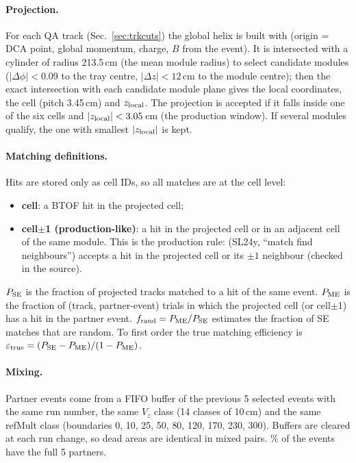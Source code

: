 
\paragraph{Projection.} For each QA track (Sec.~\ref{sec:trkcuts}) the global helix is built with
 (origin = DCA point, global momentum, charge, $B$ from the event).
It is intersected with a cylinder of radius 213.5\,cm (the mean module radius) to select candidate
modules ($|\Delta\phi|<0.09$ to the tray centre, $|\Delta z|<12$\,cm to the module centre); then the exact
intersection with each candidate module plane gives the local coordinates, the cell (pitch 3.45\,cm) and
$z_{\rm local}$. The projection is accepted if it falls inside one of the six cells and $|z_{\rm local}|<3.05$\,cm
(the production window). If several modules qualify, the one with smallest $|z_{\rm local}|$ is kept.

\paragraph{Matching definitions.} Hits are stored only as cell IDs, so all matches are at the cell level:
\begin{itemize}
\item \textbf{cell}: a BTOF hit in the projected cell;
\item \textbf{cell$\pm$1 (production-like)}: a hit in the projected cell or in an adjacent cell of the same module.
  This is the production rule:  (SL24y, ``match find neighbours'') accepts a hit in the
  projected cell or its $\pm1$ neighbour (checked in the source).
\end{itemize}
$P_{\rm SE}$ is the fraction of projected tracks matched to a hit of the same event.
$P_{\rm ME}$ is the fraction of (track, partner-event) trials in which the projected cell (or cell$\pm$1) has a hit
in the partner event. $f_{\rm rand}=P_{\rm ME}/P_{\rm SE}$ estimates the fraction of SE matches that are random.
To first order the true matching efficiency is $\varepsilon_{\rm true}=(P_{\rm SE}-P_{\rm ME})/(1-P_{\rm ME})$.

\paragraph{Mixing.} Partner events come from a FIFO buffer of the previous 5 selected events with the
same run number, the same $V_z$ class (14 classes of 10\,cm) and the same refMult class (boundaries 0, 10, 25,
50, 80, 120, 170, 230, 300). Buffers are cleared at each run change, so dead areas are identical in mixed pairs.
\meFracFullMixTest\% of the events have the full 5 partners.

